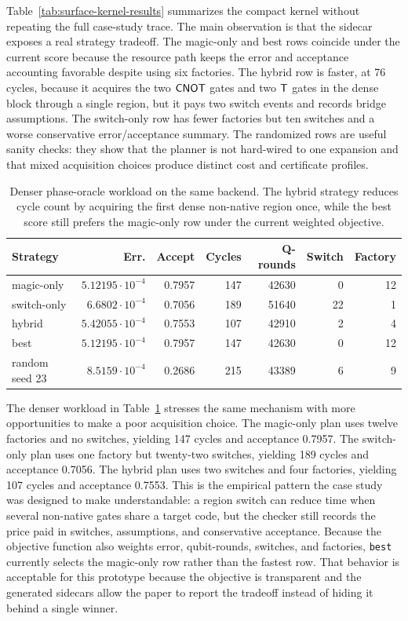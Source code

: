 Table~\ref{tab:surface-kernel-results} summarizes the compact kernel without repeating the full case-study trace.
The main observation is that the sidecar exposes a real strategy tradeoff.
The magic-only and best rows coincide under the current score because the resource path keeps the error and acceptance accounting favorable despite using six factories.
The hybrid row is faster, at 76 cycles, because it acquires the two $\mathsf{CNOT}$ gates and two $\mathsf{T}$ gates in the dense block through a single  region, but it pays two switch events and records bridge assumptions.
The switch-only row has fewer factories but ten switches and a worse conservative error/acceptance summary.
The randomized rows are useful sanity checks: they show that the planner is not hard-wired to one expansion and that mixed acquisition choices produce distinct cost and certificate profiles.

\begin{table}[t]
\centering
\caption{Denser phase-oracle workload on the same backend. The hybrid strategy reduces cycle count by acquiring the first dense non-native region once, while the best score still prefers the magic-only row under the current weighted objective.}
\label{tab:complex-results-sections}
\begin{tabular}{lrrrrrr}
\toprule
Strategy & Err. & Accept & Cycles & Q-rounds & Switch & Factory \\
\midrule
magic-only & $5.12195{\cdot}10^{-4}$ & 0.7957 & 147 & 42630 & 0 & 12 \\
switch-only & $6.6802{\cdot}10^{-4}$ & 0.7056 & 189 & 51640 & 22 & 1 \\
hybrid & $5.42055{\cdot}10^{-4}$ & 0.7553 & 107 & 42910 & 2 & 4 \\
best & $5.12195{\cdot}10^{-4}$ & 0.7957 & 147 & 42630 & 0 & 12 \\
random seed 23 & $8.5159{\cdot}10^{-4}$ & 0.2686 & 215 & 43389 & 6 & 9 \\
\bottomrule
\end{tabular}
\end{table}

The denser workload in Table~\ref{tab:complex-results-sections} stresses the same mechanism with more opportunities to make a poor acquisition choice.
The magic-only plan uses twelve factories and no switches, yielding 147 cycles and acceptance 0.7957.
The switch-only plan uses one factory but twenty-two switches, yielding 189 cycles and acceptance 0.7056.
The hybrid plan uses two switches and four factories, yielding 107 cycles and acceptance 0.7553.
This is the empirical pattern the case study was designed to make understandable: a region switch can reduce time when several non-native gates share a target code, but the checker still records the price paid in switches, assumptions, and conservative acceptance.
Because the objective function also weights error, qubit-rounds, switches, and factories, \texttt{best} currently selects the magic-only row rather than the fastest row.
That behavior is acceptable for this prototype because the objective is transparent and the generated sidecars allow the paper to report the tradeoff instead of hiding it behind a single winner.

